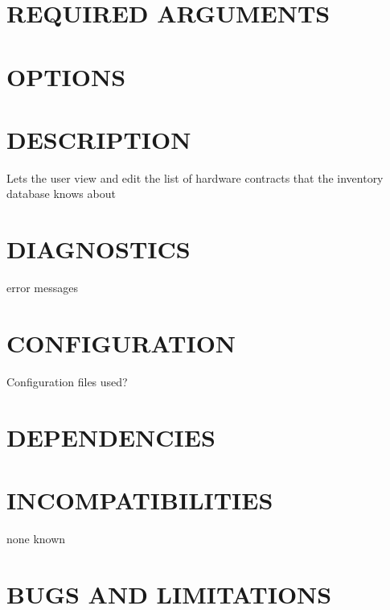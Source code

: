\documentclass{book}
\begin{document}
\section{REQUIRED ARGUMENTS}
\label{_REQUIRED_ARGUMENTS}
\hypertarget{_REQUIRED_ARGUMENTS}{}


\section{OPTIONS}
\label{_OPTIONS}
\hypertarget{_OPTIONS}{}


\section{DESCRIPTION}
\label{_DESCRIPTION}
\hypertarget{_DESCRIPTION}{}



Lets the user view and edit the list of hardware contracts that the inventory database knows about


\section{DIAGNOSTICS}
\label{_DIAGNOSTICS}
\hypertarget{_DIAGNOSTICS}{}



error messages


\section{CONFIGURATION}
\label{_CONFIGURATION}
\hypertarget{_CONFIGURATION}{}



Configuration files used?


\section{DEPENDENCIES}
\label{_DEPENDENCIES}
\hypertarget{_DEPENDENCIES}{}


\section{INCOMPATIBILITIES}
\label{_INCOMPATIBILITIES}
\hypertarget{_INCOMPATIBILITIES}{}



none known


\section{BUGS AND LIMITATIONS}
\label{_BUGS_AND_LIMITATIONS}
\hypertarget{_BUGS_AND_LIMITATIONS}{}
\end{document}
